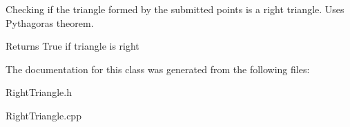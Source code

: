 Checking if the triangle formed by the submitted points is a right triangle. Uses Pythagoras\textquotesingle{} theorem. \begin{DoxyReturn}{Returns}
True if triangle is right 
\end{DoxyReturn}


The documentation for this class was generated from the following files\+:\begin{DoxyCompactItemize}
\item 
Right\+Triangle.\+h\item 
Right\+Triangle.\+cpp\end{DoxyCompactItemize}
